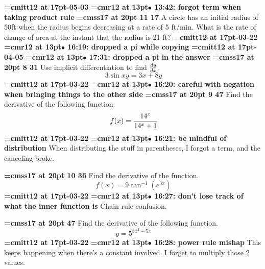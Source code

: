 {\medskip\noindent\bf\font\titlefont=cmitt12 at 17pt-05-03}\medskip
{\smallskip\noindent\bf\font\titlefont=cmr12 at 13pt\titlefont $\bullet$ 13:42: forgot term when taking product rule}\smallskip
{}
{\medskip\noindent\bf\font\titlefont=cmss17 at 20pt 11 17}\medskip
A circle has an initial radius of 50ft when the radius
begins decreasing at a rate of 5 ft/min. What is the rate
of change of area at the instant that the radius is 21 ft?
{\medskip\noindent\bf\font\titlefont=cmitt12 at 17pt-03-22}\medskip
{\smallskip\noindent\bf\font\titlefont=cmr12 at 13pt\titlefont $\bullet$ 16:19: dropped a pi while copying}\smallskip
{\medskip\noindent\bf\font\titlefont=cmitt12 at 17pt-04-05}\medskip
{\smallskip\noindent\bf\font\titlefont=cmr12 at 13pt\titlefont $\bullet$ 17:31: dropped a pi in the answer}\smallskip
{}
{\medskip\noindent\bf\font\titlefont=cmss17 at 20pt 8 31}\medskip
Use implicit differentiation to find ${dy \over dx}$.
$$\
3 \sin xy = 3x + 8y
$$
{\medskip\noindent\bf\font\titlefont=cmitt12 at 17pt-03-22}\medskip
{\smallskip\noindent\bf\font\titlefont=cmr12 at 13pt\titlefont $\bullet$ 16:20: careful with negation when bringing things to the other side}\smallskip
\xrdef{node101}
{\medskip\noindent\bf\font\titlefont=cmss17 at 20pt 9 47}\medskip
Find the derivative of the following function:
$$\
f(x) = {
14^x
\over
{14^x + 1}
}
$$
{\medskip\noindent\bf\font\titlefont=cmitt12 at 17pt-03-22}\medskip
{\smallskip\noindent\bf\font\titlefont=cmr12 at 13pt\titlefont $\bullet$ 16:21: be mindful of distribution}\smallskip
When distributing the stuff in parentheses, I forgot a term, and the canceling broke.
\par

{\medskip\noindent\bf\font\titlefont=cmss17 at 20pt 10 36}\medskip
Find the derivative of the function.
$$\
f(x) = 9\tan^{-1}(e^{3x})
$$
{\medskip\noindent\bf\font\titlefont=cmitt12 at 17pt-03-22}\medskip
{\smallskip\noindent\bf\font\titlefont=cmr12 at 13pt\titlefont $\bullet$ 16:27: don't lose track of what the inner function is}\smallskip
Chain rule confusion.
\par

{\medskip\noindent\bf\font\titlefont=cmss17 at 20pt 47}\medskip
Find the derivative of the following function.
$$\
y = 5^{8x^2 - 5x}
$$
{\medskip\noindent\bf\font\titlefont=cmitt12 at 17pt-03-22}\medskip
{\smallskip\noindent\bf\font\titlefont=cmr12 at 13pt\titlefont $\bullet$ 16:28: power rule mishap}\smallskip
This keeps happening when there's a constant involved. I forget to multiply those 2 values.
\par

